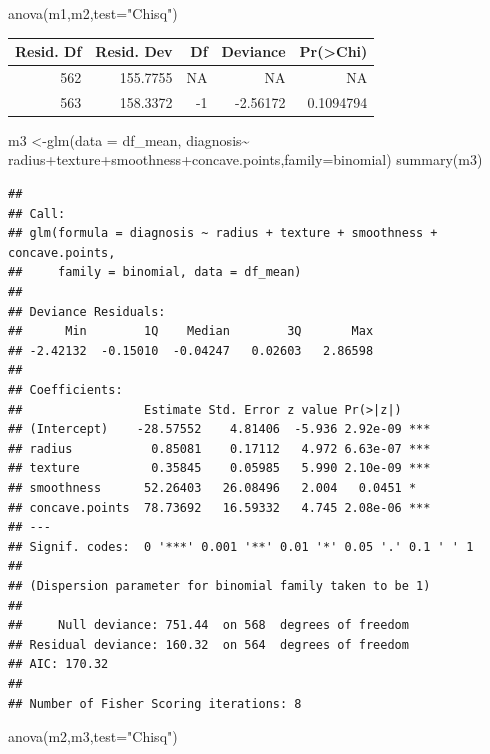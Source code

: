 \documentclass[
  11pt,
]{article}
\newenvironment{Shaded}{\begin{snugshade}}{\end{snugshade}}
\newcommand{\AttributeTok}[1]{\textcolor[rgb]{0.77,0.63,0.00}{#1}}
\newcommand{\FunctionTok}[1]{\textcolor[rgb]{0.00,0.00,0.00}{#1}}
\newcommand{\NormalTok}[1]{#1}
\newcommand{\OtherTok}[1]{\textcolor[rgb]{0.56,0.35,0.01}{#1}}
\newcommand{\SpecialCharTok}[1]{\textcolor[rgb]{0.00,0.00,0.00}{#1}}
\newcommand{\StringTok}[1]{\textcolor[rgb]{0.31,0.60,0.02}{#1}}
\begin{document}
\begin{Shaded}
\begin{Highlighting}[]
\FunctionTok{anova}\NormalTok{(m1,m2,}\AttributeTok{test=}\StringTok{"Chisq"}\NormalTok{)}
\end{Highlighting}
\end{Shaded}

\begin{tabular}{r|r|r|r|r}
\hline
Resid. Df & Resid. Dev & Df & Deviance & Pr(>Chi)\\
\hline
562 & 155.7755 & NA & NA & NA\\
\hline
563 & 158.3372 & -1 & -2.56172 & 0.1094794\\
\hline
\end{tabular}

\begin{Shaded}
\begin{Highlighting}[]
\NormalTok{m3 }\OtherTok{\textless{}{-}}\FunctionTok{glm}\NormalTok{(}\AttributeTok{data =}\NormalTok{ df\_mean, diagnosis}\SpecialCharTok{\textasciitilde{}}\NormalTok{ radius}\SpecialCharTok{+}\NormalTok{texture}\SpecialCharTok{+}\NormalTok{smoothness}\SpecialCharTok{+}\NormalTok{concave.points,}\AttributeTok{family=}\NormalTok{binomial)}
\FunctionTok{summary}\NormalTok{(m3)}
\end{Highlighting}
\end{Shaded}

\begin{verbatim}
## 
## Call:
## glm(formula = diagnosis ~ radius + texture + smoothness + concave.points, 
##     family = binomial, data = df_mean)
## 
## Deviance Residuals: 
##      Min        1Q    Median        3Q       Max  
## -2.42132  -0.15010  -0.04247   0.02603   2.86598  
## 
## Coefficients:
##                 Estimate Std. Error z value Pr(>|z|)    
## (Intercept)    -28.57552    4.81406  -5.936 2.92e-09 ***
## radius           0.85081    0.17112   4.972 6.63e-07 ***
## texture          0.35845    0.05985   5.990 2.10e-09 ***
## smoothness      52.26403   26.08496   2.004   0.0451 *  
## concave.points  78.73692   16.59332   4.745 2.08e-06 ***
## ---
## Signif. codes:  0 '***' 0.001 '**' 0.01 '*' 0.05 '.' 0.1 ' ' 1
## 
## (Dispersion parameter for binomial family taken to be 1)
## 
##     Null deviance: 751.44  on 568  degrees of freedom
## Residual deviance: 160.32  on 564  degrees of freedom
## AIC: 170.32
## 
## Number of Fisher Scoring iterations: 8
\end{verbatim}

\begin{Shaded}
\begin{Highlighting}[]
\FunctionTok{anova}\NormalTok{(m2,m3,}\AttributeTok{test=}\StringTok{"Chisq"}\NormalTok{)}
\end{Highlighting}
\end{Shaded}
\end{document}
